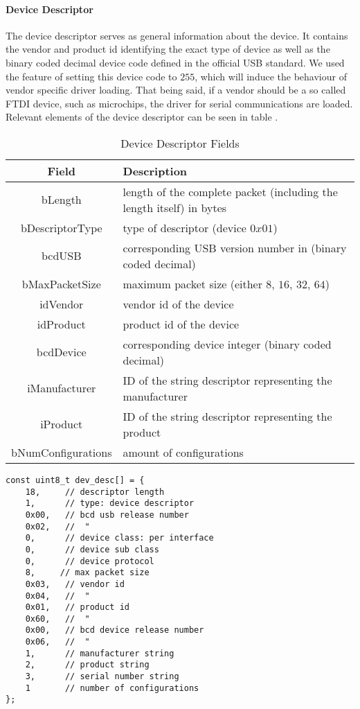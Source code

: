 \paragraph{Device Descriptor}
The device descriptor serves as general information about the device. It contains the vendor and product id identifying the exact type of device as 
well as the binary coded decimal device code defined in the official USB standard. We used the feature of setting this device code to $255$, which will 
induce the behaviour of vendor specific driver loading. That being said, if a vendor should be a so called FTDI device, such as microchips, the 
driver for serial communications are loaded. Relevant elements of the device descriptor can be seen in table .%

\begin{table}[h!]
\begin{tabular}{c| p{9cm}}
Field & Description \\ \hline
bLength & length of the complete packet (including the length itself) in bytes \\
bDescriptorType & type of descriptor (device $0x01$) \\
bcdUSB & corresponding USB version number in (binary coded decimal) \\ 
bMaxPacketSize & maximum packet size (either $8$, $16$, $32$, $64$)\\
idVendor & vendor id of the device\\
idProduct & product id of the device\\ 
bcdDevice & corresponding device integer (binary coded decimal) \\
iManufacturer & ID of the string descriptor representing the manufacturer\\
iProduct & ID of the string descriptor representing the product \\
bNumConfigurations & amount of configurations \\ 
\end{tabular}
\caption[Table]{Device Descriptor Fields}
\label{tab:devicedescriptor}
\end{table}
\begin{minipage}{\textwidth}
\begin{verbatim}
const uint8_t dev_desc[] = {
	18,     // descriptor length
	1,      // type: device descriptor
	0x00,   // bcd usb release number
	0x02,   //  "
	0,      // device class: per interface
	0,      // device sub class
	0,      // device protocol
	8,     // max packet size
	0x03,   // vendor id
	0x04,   //  "
	0x01,   // product id
	0x60,   //  "
	0x00,   // bcd device release number
	0x06,   //  "
	1,      // manufacturer string
	2,      // product string
	3,      // serial number string
	1       // number of configurations
};
\end{verbatim}
\end{minipage}

